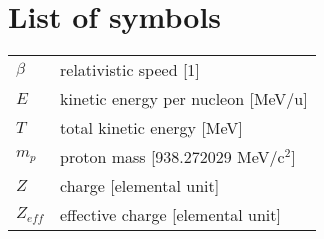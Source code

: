 
\chapter{List of symbols}

\begin{tabular}{l l}

$\beta$ & relativistic speed [1] \\
$E$ & kinetic energy per nucleon [MeV/u] \\
$T$ & total kinetic energy [MeV] \\
$m_p$ & proton mass [938.272029 MeV/c$^2$] \\
$Z$ & charge [elemental unit] \\
$Z_{eff}$ & effective charge [elemental unit] \\
\end{tabular}